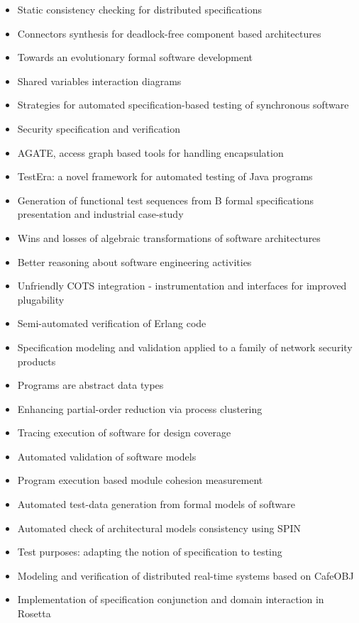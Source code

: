 {\begin{itemize}[itemsep=-1ex]
  \item Static consistency checking for distributed specifications
  \item Connectors synthesis for deadlock-free component based architectures
  \item Towards an evolutionary formal software development
  \item Shared variables interaction diagrams
  \item Strategies for automated specification-based testing of synchronous software
  \item Security specification and verification
  \item AGATE, access graph based tools for handling encapsulation
  \item TestEra: a novel framework for automated testing of Java programs
  \item Generation of functional test sequences from B formal specifications presentation and industrial case-study
  \item Wins and losses of algebraic transformations of software architectures
  \item Better reasoning about software engineering activities
  \item Unfriendly COTS integration - instrumentation and interfaces for improved plugability
  \item Semi-automated verification of Erlang code
  \item Specification modeling and validation applied to a family of network security products
  \item Programs are abstract data types
  \item Enhancing partial-order reduction via process clustering
  \item Tracing execution of software for design coverage
  \item Automated validation of software models
  \item Program execution based module cohesion measurement
  \item Automated test-data generation from formal models of software
  \item Automated check of architectural models consistency using SPIN
  \item Test purposes: adapting the notion of specification to testing
  \item Modeling and verification of distributed real-time systems based on CafeOBJ
  \item Implementation of specification conjunction and domain interaction in Rosetta

\end{itemize}}

